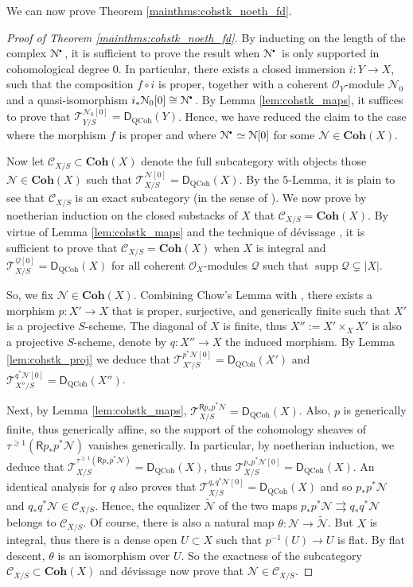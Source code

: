 \documentclass{amsart}
\theoremstyle{plain}
\theoremstyle{definition}
\theoremstyle{remark}
\numberwithin{equation}{section}
\newcommand{\Orb}{\mathcal{O}}
\newcommand{\COH}[1]{\mathbf{Coh}({#1})}
\DeclareMathOperator{\supp}{supp}
\newcommand{\trunc}[1]{\tau^{{#1}}}
\newcommand{\RDERF}{\mathsf{R}}
\newcommand{\DCAT}{\mathsf{D}}
\newcommand{\homotopic}{\simeq}
\newcommand{\shv}[1]{\mathcal{{#1}}}
\newcommand{\DQCOH}{\DCAT_{\mathrm{QCoh}}}
\newcommand{\TSUB}[2]{\mathcal{T}_{{#1}}^{{#2}}}
\newcommand{\CSUB}[1]{\mathcal{C}_{{#1}}}
\newcommand{\sbt}{\,\begin{picture}(-1,-1)(0,-2)\circle*{1.5}\end{picture}\ }
\newcommand{\cplx}[1]{\shv{{#1}}^{\sbt}}
\begin{document}
We can now prove Theorem
\ref{mainthms:cohstk_noeth_fd}.
\begin{proof}[Proof of Theorem
  \ref{mainthms:cohstk_noeth_fd}]
    By inducting on the length of the complex $\cplx{N}$, it is
  sufficient to prove the result when $\cplx{N}$ is only
  supported in cohomological degree $0$. In particular, there exists a
  closed immersion $i : Y \to X$, such that the composition $f\circ
  i$ is proper, together with a coherent $\Orb_{Y}$-module
  $\shv{N}_0$ and a quasi-isomorphism $i_*\shv{N}_0[0] \cong
  \cplx{N}$. By Lemma \ref{lem:cohstk_maps}, it suffices to
  prove that $\TSUB{Y/S}{\shv{N}_0[0]} =
  \DQCOH(Y)$. Hence, we have reduced the claim to the
  case where the morphism $f$ is proper and where $\cplx{N}
  \homotopic \shv{N}[0]$ for some $\shv{N}\in \COH{X}$.
  
  Now let $\CSUB{X/S} \subset \COH{X}$ denote the full subcategory
  with objects those $\shv{N} \in \COH{X}$ such that
  $\TSUB{X/S}{\shv{N}[0]} = \DQCOH(X)$. By the 5-Lemma,
  it is plain to see that $\CSUB{X/S}$ is an exact subcategory (in the
  sense of \cite[III.3.1]{EGA}). We now prove by
  noetherian induction on the closed substacks of $X$ that $\CSUB{X/S}
  = \COH{X}$. By virtue of Lemma \ref{lem:cohstk_maps} and the
  technique of d\'evissage \cite[Proof of III.3.2]{EGA}, it is sufficient to
  prove that $\CSUB{X/S} = \COH{X}$ when $X$ is integral and
  $\TSUB{X/S}{\shv{Q}[0]} = \DQCOH(X)$ for all coherent
  $\Orb_X$-modules $\shv{Q}$ such that $\supp \shv{Q} \subsetneq |X|$. 

  So, we fix $\shv{N} \in \COH{X}$. Combining Chow's Lemma
  \cite[II.5.6.1]{EGA} with \cite[Thm.~2.7]{MR1844577}, 
  there exists a morphism $p : X' \to X$ that is proper, surjective, and
  generically finite such that $X'$ is a projective
  $S$-scheme. The diagonal of $X$ is finite, thus $X'':= X'\times_X X'$ is
  also a projective $S$-scheme, denote by $q
  : X'' \to X$ the induced morphism. By Lemma \ref{lem:cohstk_proj}
  we deduce that $\TSUB{X'/S}{p^*\shv{N}[0]} =
  \DQCOH(X')$ and $\TSUB{X''/S}{q^*\shv{N}[0]} = \DQCOH(X'')$. 

  Next, by Lemma \ref{lem:cohstk_maps}, $\TSUB{X/S}{\RDERF p_*
    p^*\shv{N}}=\DQCOH(X)$. Also, $p$ is generically finite, thus
  generically affine, so the support of the cohomology sheaves of
  $\trunc{\geq 1}(\RDERF p_* p^*\shv{N})$ vanishes generically. In
  particular, by noetherian induction, we deduce that
  $\TSUB{X/S}{\trunc{\geq 1}(\RDERF p_* p^*\shv{N})}=\DQCOH(X)$, thus
  $\TSUB{X/S}{p_*p^*\shv{N}[0]} = \DQCOH(X)$. An identical analysis
  for $q$ also proves that $\TSUB{X/S}{q_*q^*\shv{N}[0]} = \DQCOH(X)$
  and so $p_*p^*\shv{N}$ and $q_*q^*\shv{N} \in \CSUB{X/S}$. Hence,
  the equalizer $\tilde{\shv{N}}$ of the two maps $p_*p^*\shv{N}
  \rightrightarrows q_*q^*\shv{N}$ belongs to $\CSUB{X/S}$. Of course,
  there is also a natural map $\theta : \shv{N} \to \tilde{\shv{N}}$. But
  $X$ is integral, thus there is a dense open $U \subset X$ such that
  $p^{-1}(U) \to U$ is flat. By flat descent, $\theta$ is
  an isomorphism over $U$. So the exactness of the subcategory
  $\CSUB{X/S} \subset \COH{X}$ and d\'evissage now prove that
  $\shv{N} \in \CSUB{X/S}$.
\end{proof}
\end{document}
